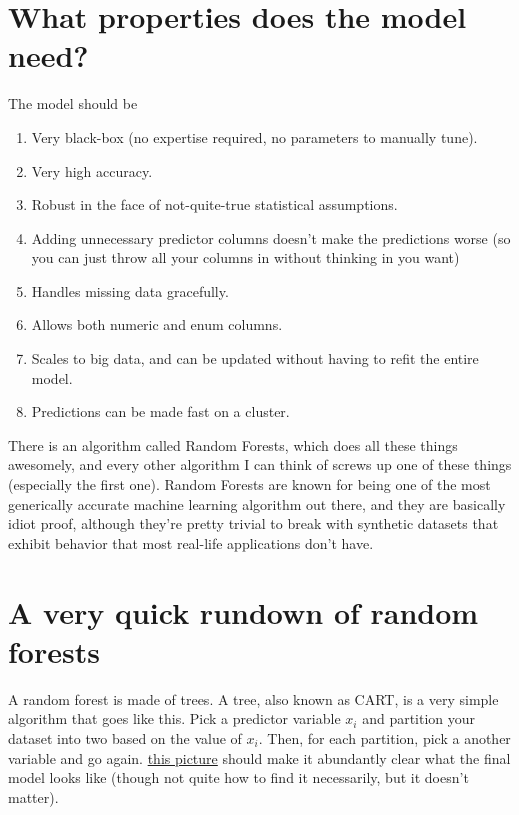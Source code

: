 \documentclass[a4paper,12pt]{article}
\begin{document}
\section*{What properties does the model need?}

The model should be 
\begin{enumerate}
\item Very black-box (no expertise required, no parameters to manually tune).  
\item Very high accuracy.
\item Robust in the face of not-quite-true statistical assumptions.
\item Adding unnecessary predictor columns doesn't make the predictions worse (so you can just throw all your columns in without thinking in you want) 
\item Handles missing data gracefully.
\item Allows both numeric and enum columns.
\item Scales to big data, and can be updated without having to refit the entire model.
\item Predictions can be made fast on a cluster.  
\end{enumerate}
There is an algorithm called Random Forests, which does all these things awesomely, and every other algorithm I can think of screws up one of these things (especially the first one).  
Random Forests are known for being one of the most generically accurate machine learning algorithm out there, and they are basically idiot proof, although they're pretty trivial to break with synthetic datasets that exhibit behavior that most real-life applications don't have.

\section*{A very quick rundown of random forests}

A random forest is made of trees.
A tree, also known as CART, is a very simple algorithm that goes like this.
Pick a predictor variable $x_i$ and partition your dataset into two based on the value of $x_i$.
Then, for each partition, pick a another variable and go again.
\href{http://en.wikipedia.org/wiki/File:CART_tree_titanic_survivors.png}{this picture} should make it abundantly clear what the final model looks like (though not quite how to find it necessarily, but it doesn't matter).  
\end{document}
